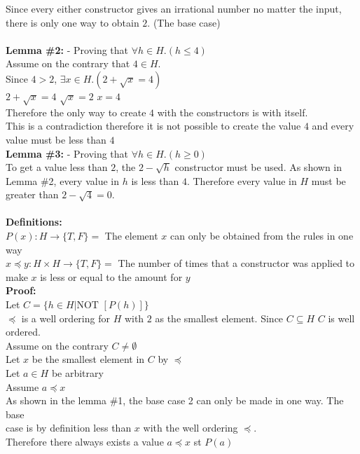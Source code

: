 \documentclass[11pt]{article}
\newcommand{\Not}{\mbox{NOT }}
\begin{document}
\begin{enumerate}
\begin{solution}
Since every either constructor gives an irrational number no matter the input, there is only one way to obtain $2$. (The base case)\\\\
{\bf Lemma \#2:} - Proving that $\forall h\in H.(h\le 4)$\\
Assume on the contrary that $4\in H$.\\
Since $4>2$, $\exists x\in H.(2+\sqrt x = 4)$\\
$2+\sqrt x = 4$  $\sqrt x = 2$  $x = 4$\\
Therefore the only way to create $4$ with the constructors is with itself.\\
This is a contradiction therefore it is not possible to create the value $4$ and every value must be less than $4$\\
{\bf Lemma \#3:} - Proving that $\forall h\in H.(h\ge 0)$\\
To get a value less than $2$, the $2-\sqrt h$ constructor must be used. As shown in Lemma \#2, every value in $h$ is less than $4$. Therefore every value in $H$ must be greater than $2-\sqrt 4 = 0$.\\\\
{\bf Definitions:}\\
$P(x): H\rightarrow \{T,F\} = $ The element $x$ can only be obtained from the rules in one way\\
$x\preccurlyeq y: H\times H \rightarrow \{T,F\} =$ The number of times that a constructor was applied to make $x$ is less or equal to the amount for $y$ \\
{\bf Proof:}\\
Let $C =\{h\in H|\Not [P(h)]\}$\\
$\preccurlyeq$ is a well ordering for $H$ with $2$ as the smallest element. Since $C\subseteq H$ $C$ is well ordered.\\
\null\quad Assume on the contrary $C\ne\emptyset$ \\
\null\quad Let $x$ be the smallest element in $C$ by $\preccurlyeq$\\
\null\quad\quad Let $a\in H$ be arbitrary\\
\null\qquad\quad Assume $a\preccurlyeq x$\\
\null\qquad\quad As shown in the lemma \#1, the base case 2 can only be made in one way. The base \\
\null\qquad\quad case is by definition less than $x$ with the well ordering $\preccurlyeq$. \\
\null\qquad\quad Therefore there always exists a value $a\preccurlyeq x$ st $P(a)$\\

\end{solution}
\end{enumerate}
\end{document}
